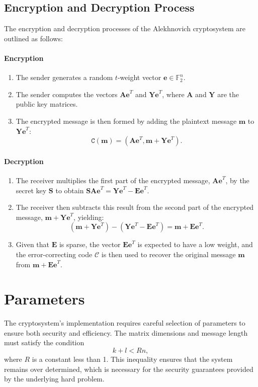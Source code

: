 \subsection{Encryption and Decryption Process}

The encryption and decryption processes of the Alekhnovich cryptosystem are outlined as follows:

\paragraph{Encryption}
\begin{enumerate}
    \item The sender generates a random $t$-weight vector $\mathbf{e} \in \mathbb{F}_2^n$.
    \item The sender computes the vectors $\mathbf{Ae}^T$ and $\mathbf{Ye}^T$, where $\mathbf{A}$ and $\mathbf{Y}$ are the public key matrices.
    \item The encrypted message is then formed by adding the plaintext message $\mathbf{m}$ to $\mathbf{Ye}^T$:
    \[
    \texttt{C}(\mathbf{m}) = (\mathbf{Ae}^T, \mathbf{m} + \mathbf{Ye}^T).
    \]
\end{enumerate}

\paragraph{Decryption}
\begin{enumerate}
    \item The receiver multiplies the first part of the encrypted message, $\mathbf{Ae}^T$, by the secret key $\mathbf{S}$ to obtain $\mathbf{SAe}^T = \mathbf{Ye}^T - \mathbf{Ee}^T$.
    \item The receiver then subtracts this result from the second part of the encrypted message, $\mathbf{m} + \mathbf{Ye}^T$, yielding:
    \[
    (\mathbf{m} + \mathbf{Ye}^T) - (\mathbf{Ye}^T - \mathbf{Ee}^T) = \mathbf{m} + \mathbf{Ee}^T.
    \]
    \item Given that $\mathbf{E}$ is sparse, the vector $\mathbf{Ee}^T$ is expected to have a low weight, and the error-correcting code $\mathcal{C}$ is then used to recover the original message $\mathbf{m}$ from $\mathbf{m} + \mathbf{Ee}^T$.
\end{enumerate}

\section{Parameters}
The cryptosystem's implementation requires careful selection of parameters to ensure both security and efficiency. The matrix dimensions and message length must satisfy the condition $$k + l < Rn,$$ where $R$ is a constant less than 1. This inequality ensures that the system remains over determined, which is necessary for the security guarantees provided by the underlying hard problem.

